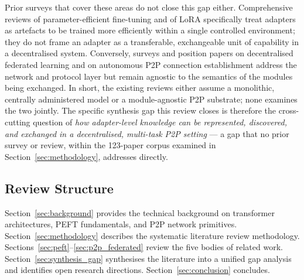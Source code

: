 Prior surveys that cover these areas do not close this gap either. Comprehensive reviews of
parameter-efficient fine-tuning \cite{Han2024,WangAIReview2024} and of LoRA specifically
\cite{MaoLoraSurvey2024} treat adapters as artefacts to be trained more efficiently within a
single controlled environment; they do not frame an adapter as a transferable, exchangeable
unit of capability in a decentralised system. Conversely, surveys and position papers on
decentralised federated learning \cite{YeDecentralizedFL2022,WinkP2PFL2021} and on autonomous
P2P connection establishment \cite{SajinaP2PConnection2024} address the network and protocol
layer but remain agnostic to the semantics of the modules being exchanged. In short, the
existing reviews either assume a monolithic, centrally administered model or a module-agnostic
P2P substrate; none examines the two jointly. The specific synthesis gap this review closes is
therefore the cross-cutting question of \emph{how adapter-level knowledge can be represented,
discovered, and exchanged in a decentralised, multi-task P2P setting} --- a gap that no prior
survey or review, within the 123-paper corpus examined in
Section~\ref{sec:methodology}, addresses directly.

\subsection{Review Structure}
\label{sec:introduction:structure}

Section~\ref{sec:background} provides the technical background on transformer
architectures, PEFT fundamentals, and P2P network primitives. Section~\ref{sec:methodology}
describes the systematic literature review methodology. Sections~\ref{sec:peft}--\ref{sec:p2p_federated}
review the five bodies of related work. Section~\ref{sec:synthesis_gap} synthesises the
literature into a unified gap analysis and identifies open research directions.
Section~\ref{sec:conclusion} concludes.
